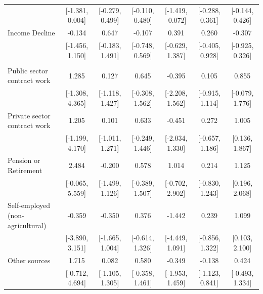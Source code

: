 \documentclass[
  10,
  letterpaper,
  DIV=11,
  numbers=noendperiod]{scrartcl}
\begin{document}
\begin{table}
\begin{tabular}[t]{lcccccc}
\hspace{1em} & {}[-1.381, 0.004] & {}[-0.279, 0.499] & {}[-0.110, 0.480] & {}[-1.419, -0.072] & {}[-0.288, 0.361] & {}[-0.144, 0.426]\\
\hspace{1em}Income Decline & -0.134 & 0.647 & -0.107 & 0.391 & 0.260 & -0.307\\
\hspace{1em} & {}[-1.456, 1.150] & {}[-0.183, 1.491] & {}[-0.748, 0.569] & {}[-0.629, 1.387] & {}[-0.405, 0.928] & {}[-0.925, 0.326]\\
\addlinespace[0.3em]
\multicolumn{7}{l}{\cellcolor[HTML]{3498DB}{\textbf{Income Source}}}\\
\hspace{1em}Public sector contract work & 1.285 & 0.127 & 0.645 & -0.395 & 0.105 & 0.855\\
\hspace{1em} & {}[-1.308, 4.365] & {}[-1.118, 1.427] & {}[-0.308, 1.562] & {}[-2.208, 1.562] & {}[-0.915, 1.114] & {}[-0.079, 1.776]\\
\hspace{1em}Private sector contract work & 1.205 & 0.101 & 0.633 & -0.451 & 0.272 & 1.005\\
\hspace{1em} & {}[-1.199, 4.170] & {}[-1.011, 1.271] & {}[-0.249, 1.446] & {}[-2.034, 1.330] & {}[-0.657, 1.186] & {}[0.136, 1.867]\\
\hspace{1em}Pension or Retirement & 2.484 & -0.200 & 0.578 & 1.014 & 0.214 & 1.125\\
\hspace{1em} & {}[-0.065, 5.559] & {}[-1.499, 1.126] & {}[-0.389, 1.507] & {}[-0.702, 2.902] & {}[-0.830, 1.243] & {}[0.196, 2.068]\\
\hspace{1em}Self-employed (non-agricultural) & -0.359 & -0.350 & 0.376 & -1.442 & 0.239 & 1.099\\
\hspace{1em} & {}[-3.890, 3.151] & {}[-1.665, 1.004] & {}[-0.614, 1.326] & {}[-4.449, 1.091] & {}[-0.856, 1.322] & {}[0.103, 2.100]\\
\hspace{1em}Other sources & 1.715 & 0.082 & 0.580 & -0.349 & -0.138 & 0.424\\
\hspace{1em} & {}[-0.712, 4.694] & {}[-1.105, 1.305] & {}[-0.358, 1.461] & {}[-1.953, 1.459] & {}[-1.123, 0.841] & {}[-0.493, 1.334]\\

\end{tabular}
\end{table}
\end{document}
